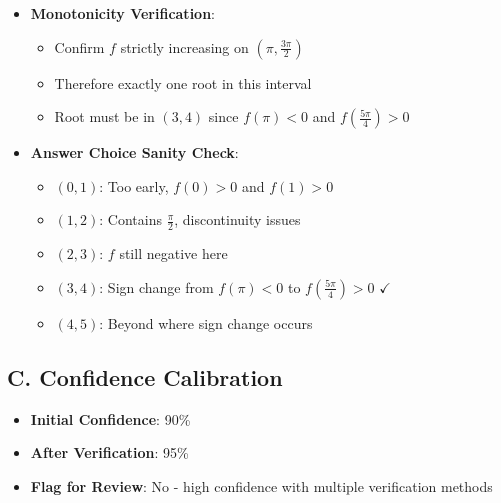 \documentclass[]{article}
\begin{document}
\begin{verificationbox}
\begin{itemize}[leftmargin=*]
    \item \textbf{Monotonicity Verification}:
    \begin{itemize}
        \item Confirm $f$ strictly increasing on $(\pi, \frac{3\pi}{2})$
        \item Therefore exactly one root in this interval
        \item Root must be in $(3, 4)$ since $f(\pi) < 0$ and $f(\frac{5\pi}{4}) > 0$
    \end{itemize}
    
    \item \textbf{Answer Choice Sanity Check}:
    \begin{itemize}
        \item $(0,1)$: Too early, $f(0) > 0$ and $f(1) > 0$
        \item $(1,2)$: Contains $\frac{\pi}{2}$, discontinuity issues
        \item $(2,3)$: $f$ still negative here
        \item $(3,4)$: Sign change from $f(\pi) < 0$ to $f(\frac{5\pi}{4}) > 0$ $\checkmark$
        \item $(4,5)$: Beyond where sign change occurs
    \end{itemize}
\end{itemize}

\subsection*{C. Confidence Calibration}
\begin{itemize}[leftmargin=*]
    \item \textbf{Initial Confidence}: 90\%
    \item \textbf{After Verification}: 95\%
    \item \textbf{Flag for Review}: No - high confidence with multiple verification methods
\end{itemize}
\end{verificationbox}
\end{document}
